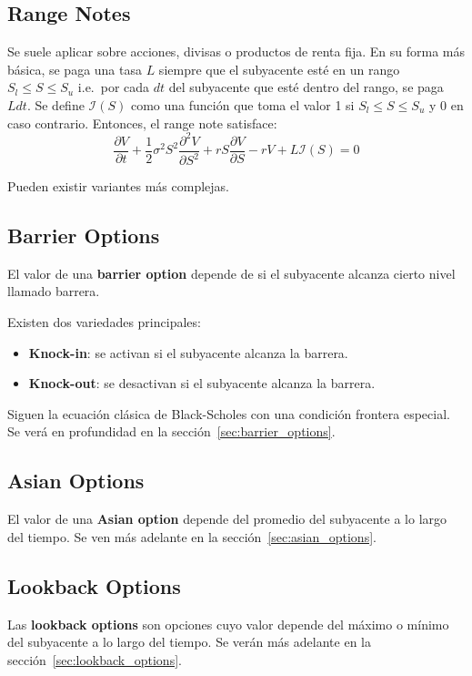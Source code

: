 \subsection{Range Notes}
Se suele aplicar sobre acciones, divisas o productos de renta fija. En su forma más básica, se paga una tasa $L$ siempre que el subyacente esté en un rango $S_l \leq S \leq S_u$ i.e.\ por cada $dt$ del subyacente que esté dentro del rango, se paga $L dt$. Se define $\mathcal{I}(S)$ como una función que toma el valor 1 si $S_l \leq S \leq S_u$ y 0 en caso contrario. Entonces, el range note satisface:
\[
    \boxed{\frac{\partial V}{\partial t} + \frac{1}{2}\sigma^2 S^2 \frac{\partial^2 V}{\partial S^2} + r S \frac{\partial V}{\partial S} - r V + L \mathcal{I}(S) = 0}
\]

Pueden existir variantes más complejas.



\subsection{Barrier Options}
El valor de una \textbf{barrier option} depende de si el subyacente alcanza cierto nivel llamado barrera.

Existen dos variedades principales:
\begin{itemize}
    \item \textbf{Knock-in}: se activan si el subyacente alcanza la barrera.
    \item \textbf{Knock-out}: se desactivan si el subyacente alcanza la barrera.
\end{itemize}

Siguen la ecuación clásica de Black-Scholes con una condición frontera especial. Se verá en profundidad en la sección~\ref{sec:barrier_options}.





\subsection{Asian Options}
El valor de una \textbf{Asian option} depende del promedio del subyacente a lo largo del tiempo. Se ven más adelante en la sección~\ref{sec:asian_options}.



\subsection{Lookback Options}
Las \textbf{lookback options} son opciones cuyo valor depende del máximo o mínimo del subyacente a lo largo del tiempo. Se verán más adelante en la sección~\ref{sec:lookback_options}.








